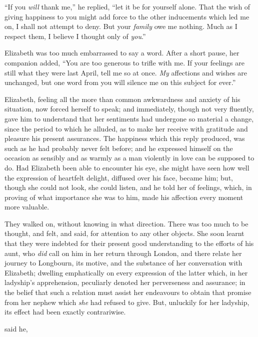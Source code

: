 “If you {\em will} thank me,” he replied, “let it be for yourself alone. That the wish of giving happiness to you might add force to the other inducements which led me on, I shall not attempt to deny. But your {\em family} owe me nothing. Much as I respect them, I believe I thought only of {\em you}.”

Elizabeth was too much embarrassed to say a word. After a short pause, her companion added, “You are too generous to trifle with me. If your feelings are still what they were last April, tell me so at once. {\em My} affections and wishes are unchanged, but one word from you will silence me on this subject for ever.”

Elizabeth, feeling all the more than common awkwardness and anxiety of his situation, now forced herself to speak; and immediately, though not very fluently, gave him to understand that her sentiments had undergone so material a change, since the period to which he alluded, as to make her receive with gratitude and pleasure his present assurances. The happiness which this reply produced, was such as he had probably never felt before; and he expressed himself on the occasion as sensibly and as warmly as a man violently in love can be supposed to do. Had Elizabeth been able to encounter his eye, she might have seen how well the expression of heartfelt delight, diffused over his face, became him; but, though she could not look, she could listen, and he told her of feelings, which, in proving of what importance she was to him, made his affection every moment more valuable.

They walked on, without knowing in what direction. There was too much to be thought, and felt, and said, for attention to any other objects. She soon learnt that they were indebted for their present good understanding to the efforts of his aunt, who {\em did} call on him in her return through London, and there relate her journey to Longbourn, its motive, and the substance of her conversation with Elizabeth; dwelling emphatically on every expression of the latter which, in her ladyship's apprehension, peculiarly denoted her perverseness and assurance; in the belief that such a relation must assist her endeavours to obtain that promise from her nephew which {\em she} had refused to give. But, unluckily for her ladyship, its effect had been exactly contrariwise.

 said he, 

